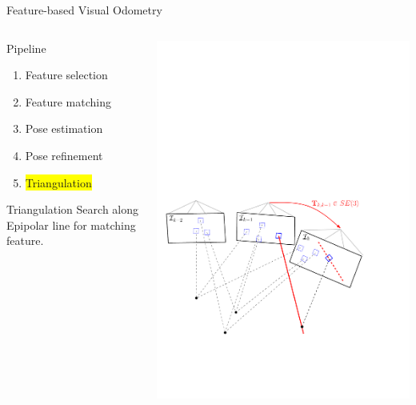 \documentclass[10pt]{beamer}
\begin{document}
\begin{frame}{Feature-based Visual Odometry}
	\begin{columns}
	  \begin{column}{0.4\textwidth}
	  	\begin{block}{Pipeline}
		  	\begin{enumerate}
				\item Feature selection
				\item Feature matching
				\item Pose estimation
				\item Pose refinement
				\item \colorbox{yellow}{Triangulation}
			\end{enumerate}
		\end{block}
		\begin{block}{Triangulation}
			Search along Epipolar line for matching feature.
		\end{block}
	  \end{column}
	  \begin{column}{0.6\textwidth}
	    \includegraphics[width=\textwidth]{img/vo_pipeline_8}
	  \end{column}
	\end{columns}
\end{frame}
\end{document}
